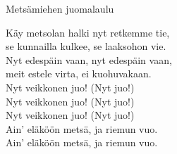 \begin{song}{Metsämiehen juomalaulu}

    Käy metsolan halki nyt retkemme tie,\\
    se kunnailla kulkee, se laaksohon vie.\\
    Nyt edespäin vaan, nyt edespäin vaan,\\
    meit estele virta, ei kuohuvakaan.\\
    Nyt veikkonen juo! (Nyt juo!)\\
    Nyt veikkonen juo! (Nyt juo!)\\
    Nyt veikkonen juo! (Nyt juo!)\\
    Ain' eläköön metsä, ja riemun vuo.\\
    Ain' eläköön metsä, ja riemun vuo.

\end{song}